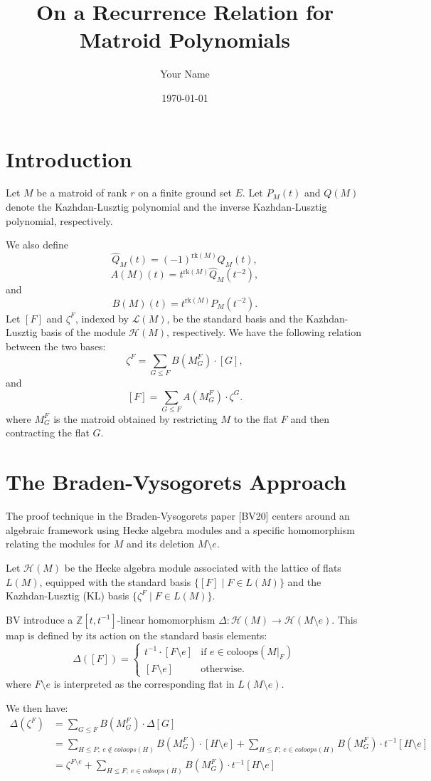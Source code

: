 \documentclass{article}
\title{On a Recurrence Relation for Matroid Polynomials}
\author{Your Name}
\date{\today}
\newcommand{\rk}{\text{rk}}
\newcommand{\Qhat}{\hat{Q}}
\begin{document}
\maketitle
\section{Introduction}

Let $M$ be a matroid of rank $r$ on a finite ground set $E$.
Let $P_M(t)$ and $Q(M)$ denote the Kazhdan-Lusztig polynomial and the
inverse Kazhdan-Lusztig polynomial, respectively.

We also define
\[\Qhat_M(t) = (-1)^{\rk(M)} Q_M(t),\]
\[ A(M)(t) = t^{\rk(M)} \Qhat_M(t^{-2}),\]
and
\[B(M)(t) = t^{\rk(M)} P_M(t^{-2}).\]
Let $[F]$ and $\zeta^F$, indexed by
$\mathcal{L}(M)$, be the standard basis and the Kazhdan-Lusztig basis of
the module $\mathcal{H}(M)$, respectively.
We have the following relation between the two bases:
\[
\zeta^F = \sum_{G \leq F} B(M^F_G) \cdot [G],\]
and
\[[F] = \sum_{G \leq F} A(M^F_G) \cdot \zeta^G.\]
where $M^F_G$ is the matroid obtained by restricting $M$ to the flat $F$ and
then contracting the flat $G$.

\section{The Braden-Vysogorets Approach}

The proof technique in the Braden-Vysogorets paper [BV20] centers around an algebraic framework using Hecke algebra modules and a specific homomorphism relating the modules for $M$ and its deletion $M \setminus e$.

Let $\mathcal{H}(M)$ be the Hecke algebra module associated with the lattice of flats $L(M)$, equipped with the standard basis $\{[F] \mid F \in L(M)\}$ and the Kazhdan-Lusztig (KL) basis $\{\zeta^F \mid F \in L(M)\}$.

BV introduce a $\mathbb{Z}[t, t^{-1}]$-linear homomorphism $\Delta: \mathcal{H}(M) \rightarrow \mathcal{H}(M \setminus e)$. This map is defined by its action on the standard basis elements:
$$ \Delta([F]) =
\begin{cases}
    t^{-1}\cdot [F \setminus e] & \text{if } e \in \text{coloops}(M|_F) \\
    [F\setminus e] & \text{otherwise}.
\end{cases}$$
where $F \setminus e$ is interpreted as the corresponding flat in $L(M \setminus e)$.

We then have:
\begin{align*}
    \Delta(\zeta^F) &= \sum_{G \leq F} B(M^F_G) \cdot \Delta[G]\\
    &= \sum_{H \leq F;\ e\notin coloops(H)} B(M^F_G)\cdot [H \setminus e] +
        \sum_{H \leq F;\ e\in coloops(H)} B(M^F_G)\cdot t^{-1}[H\setminus e]\\
        &= \zeta^{F \setminus e} + \sum_{H \leq F;\ e\in coloops(H)} B(M^F_G)\cdot t^{-1}[H\setminus e]\\
\end{align*}
\end{document}
